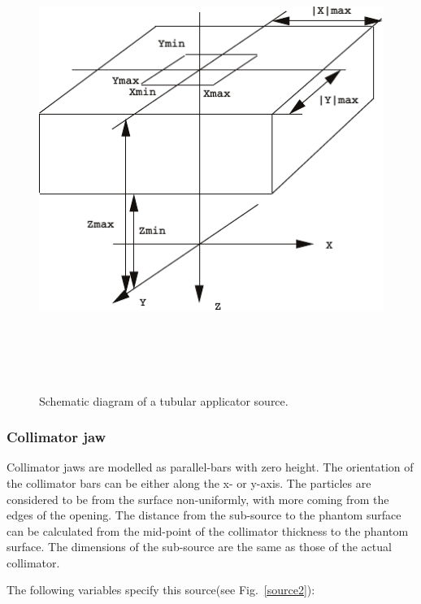 \documentclass[12pt,twoside]{article}
\begin{document}
\begin{figure}[htbp]
\begin{center}
\leavevmode
\mbox{}\hspace{0cm}
\vspace*{5cm}
\includegraphics[height=15cm]{figures/source11}
\caption[] {Schematic diagram of a tubular applicator source. }
\label{source11}
\end{center}
\end{figure}
\subsubsection{Collimator jaw}
Collimator jaws are modelled as parallel-bars with zero height. The orientation of the collimator bars can be either along the x- or y-axis. The particles are considered to be from the surface non-uniformly, with more coming from the edges of the opening. The distance from the sub-source to the phantom surface can be calculated from the mid-point of the collimator thickness to the phantom surface. The dimensions of the sub-source are the same as those of the actual collimator.

The following variables specify this source(see Fig.~\ref{source2}):
\end{document}
